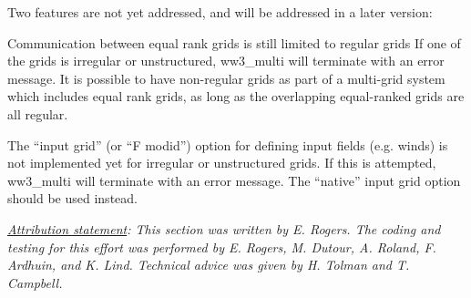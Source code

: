 Two features are not yet addressed, and will be addressed in a later version:
\begin{list}{)\hfill}
            { \leftmargin 15mm 
             \rightmargin 5mm \itemsep 0mm \parsep 0mm}
\item  Communication between equal rank grids is still limited to regular
  grids If one of the grids is irregular or unstructured, {\file ww3\_multi}
  will terminate with an error message. It is possible to have non-regular
  grids as part of a multi-grid system which includes equal rank grids, as
  long as the overlapping equal-ranked grids are all regular.

\item The ``input grid'' (or ``{F  modid}'') option for defining input fields
  (e.g. winds) is not implemented yet for irregular or unstructured grids. If
  this is attempted, {\file ww3\_multi} will terminate with an error
  message. The ``native'' input grid option should be used instead.

\end{list}

\noindent
\textrm{\textit{\underline{Attribution statement}: This section was written by
    E. Rogers. The coding and testing for this effort was performed by
    E. Rogers, M. Dutour, A. Roland, F. Ardhuin, and K. Lind. Technical advice
    was given by H. Tolman and T. Campbell.}}

